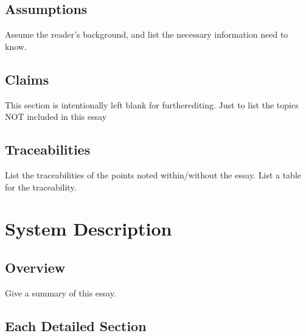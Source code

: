 \documentclass[letterpaper, 11pt]{article}
\begin{document}
\subsection{Assumptions}
\label{sec:orga6fd5b0}
Assume the reader's background, and list the necessary information need to know.
\subsection{Claims}
\label{sec:orgdb1efe3}
{\color{red}This section is intentionally left blank for furtherediting.}
Just to list the topics NOT included in this essay
\subsection{Traceabilities}
\label{sec:org9d76bb7}
List the traceabilities of the points noted within/without the essay.
{\color{red}List a table for the traceability.}
\pagebreak[4]
\section{System Description}
\label{sec:org43b08d7}
\subsection{Overview}
\label{sec:orgddd1aee}
Give a summary of this essay.
\subsection{Each Detailed Section}
\label{sec:org863b6da}
\end{document}
